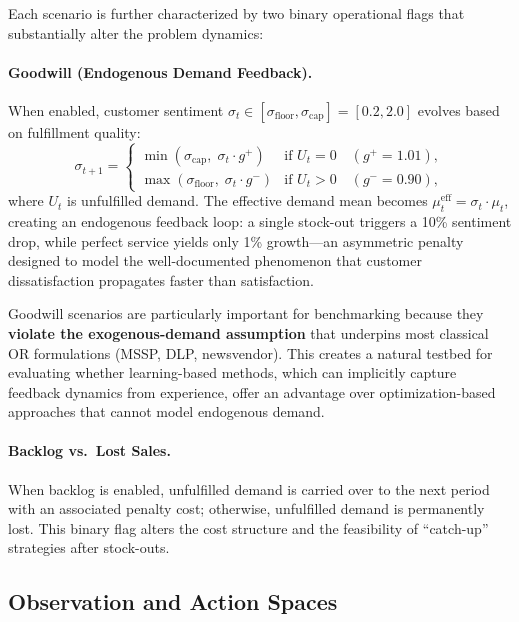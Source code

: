 Each scenario is further characterized by two binary operational flags
that substantially alter the problem dynamics:

\paragraph{Goodwill (Endogenous Demand Feedback).}
When enabled, customer sentiment $\sigma_t \in
[\sigma_{\text{floor}}, \sigma_{\text{cap}}] = [0.2, 2.0]$ evolves
based on fulfillment quality:
\begin{equation}\label{eq:goodwill}
  \sigma_{t+1} = \begin{cases}
    \min(\sigma_{\text{cap}},\; \sigma_t \cdot g^+) & \text{if } U_t = 0
    \quad (g^+ = 1.01), \\
    \max(\sigma_{\text{floor}},\; \sigma_t \cdot g^-) & \text{if } U_t > 0
    \quad (g^- = 0.90),
  \end{cases}
\end{equation}
where $U_t$ is unfulfilled demand. The effective demand mean becomes
$\mu_t^{\text{eff}} = \sigma_t \cdot \mu_t$, creating an endogenous
feedback loop: a single stock-out triggers a 10\% sentiment drop,
while perfect service yields only 1\% growth---an asymmetric penalty
designed to model the well-documented phenomenon that customer
dissatisfaction propagates faster than satisfaction.

Goodwill scenarios are particularly important for benchmarking because
they \textbf{violate the exogenous-demand assumption} that underpins
most classical OR formulations (MSSP, DLP, newsvendor). This creates
a natural testbed for evaluating whether learning-based methods, which
can implicitly capture feedback dynamics from experience, offer an
advantage over optimization-based approaches that cannot model
endogenous demand.

\paragraph{Backlog vs.\ Lost Sales.}
When backlog is enabled, unfulfilled demand is carried over to the
next period with an associated penalty cost; otherwise, unfulfilled
demand is permanently lost. This binary flag alters the cost structure
and the feasibility of ``catch-up'' strategies after stock-outs.

\subsection{Observation and Action Spaces}

